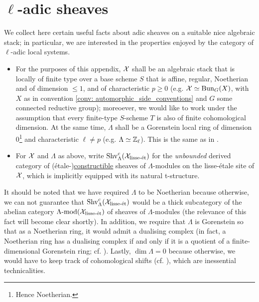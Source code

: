 \section{\texorpdfstring{$\ell$}{}-adic sheaves}
    We collect here certain useful facts about adic sheaves on a suitable nice algebraic stack; in particular, we are interested in the properties enjoyed by the category of $\ell$-adic local systems.
    
    \begin{convention} \label{conv: l_adic_sheaves_conventions}
        \noindent
        \begin{itemize}
            \item For the purposes of this appendix, $\mathcal{X}$ shall be an algebraic stack that is locally of finite type over a base scheme $S$ that is affine, regular, Noetherian and of dimension $\leq 1$, and of characteristic $p \geq 0$ (e.g. $\mathcal{X} \simeq \mathrm{Bun}_G(X)$, with $X$ as in convention \ref{conv: automorphic_side_conventions} and $G$ some connected reductive group); moreoever, we would like to work under the assumption that every finite-type $S$-scheme $T$ is also of finite cohomological dimension. At the same time, $\Lambda$ shall be a Gorenstein local ring of dimension $0$\footnote{Hence Noetherian.} and characteristic $\ell \not = p$ (e.g. $\Lambda \simeq \mathbb{Z}_{\ell}$). This is the same as in \cite{laszlo_olsson_adic_sheaves_on_artin_stacks_1}.
            \item For $\mathcal{X}$ and $\Lambda$ as above, write $\mathrm{Shv}_{\Lambda}^c(\mathcal{X}_{\mathrm{lisse}\text{-}\mathrm{\acute{e}t}})$ for the \textit{unbounded} derived category of (\'etale-)\href{https://stacks.math.columbia.edu/tag/03RW}{\underline{constructible}} sheaves of $\Lambda$-modules on the lisse-\'etale site of $\mathcal{X}$, which is implicitly equipped with its natural t-structure.
        \end{itemize}
    \end{convention}
    \begin{remark}
        It should be noted that we have required $\Lambda$ to be Noetherian because otherwise, we can not guarantee that $\mathrm{Shv}_{\Lambda}^c(\mathcal{X}_{\mathrm{lisse}\text{-}\mathrm{\acute{e}t}})$ would be a thick subcategory of the abelian category $\Lambda\text{-}\mathrm{mod}(\mathcal{X}_{\mathrm{lisse}\text{-}\mathrm{\acute{e}t}})$ of sheaves of $\Lambda$-modules (the relevance of this fact will become clear shortly). In addition, we require that $\Lambda$ is Gorenstein so that as a Noetherian ring, it would admit a dualising complex (in fact, a Noetherian ring has a dualising complex if and only if it is a quotient of a finite-dimensional Gorenstein ring; cf. \cite[Corollary 1.4]{kawasaki_macaulayfication_of_noetherian_rings}). Lastly, $\dim \Lambda = 0$ because otherwise, we would have to keep track of cohomological shifts (cf. \cite[\href{https://stacks.math.columbia.edu/tag/0AWS}{Tag 0AWS} and \href{https://stacks.math.columbia.edu/tag/0B5A}{Tag 0B5A}]{stacks}), which are inessential technicalities.
    \end{remark}
    
